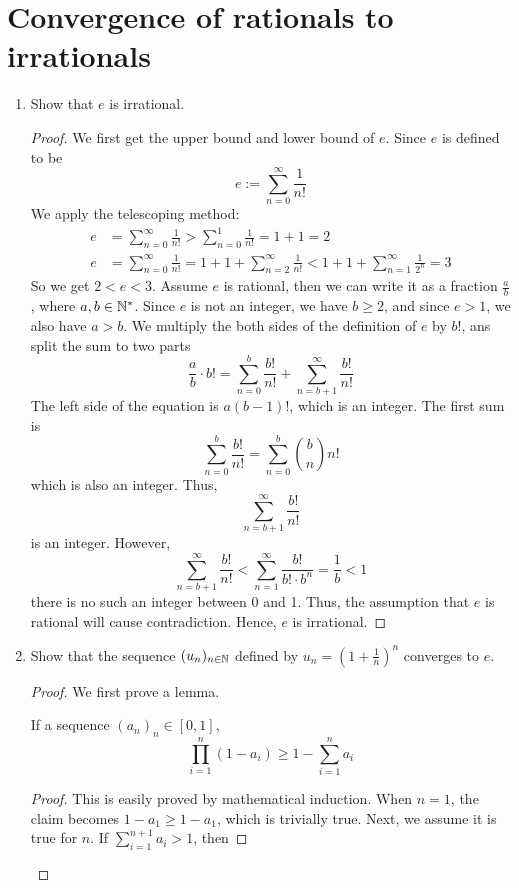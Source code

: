 \section{Convergence of rationals to irrationals}
\begin{enumerate}
	\item Show that $e$ is irrational.
    \begin{proof}
    We first get the upper bound and lower bound of $e$.
    Since $e$ is defined to be
    \[e:=\sum_{n=0}^\infty \frac{1}{n!} \]
    We apply the telescoping method:
    \begin{align*}
    	e&=\sum_{n=0}^\infty \frac{1}{n!}>\sum_{n=0}^1 \frac{1}{n!}=1+1=2\\
        e&=\sum_{n=0}^\infty \frac{1}{n!}=1+1+\sum_{n=2}^\infty \frac{1}{n!}<1+1+\sum_{n=1}^\infty \frac{1}{2^n}=3
    \end{align*}
    So we get \(2<e<3\).
    Assume $e$ is rational, then we can write it as a fraction $\frac{a}{b}$, where \(a,b\in\mathbb{N}^*\).
    Since $e$ is not an integer, we have \(b\geq2\), and since \(e>1\), we also have \(a>b\).
    We multiply the both sides of the definition of $e$ by $b!$, ans split the sum to two parts
    \[ \frac{a}{b}\cdot b!=\sum_{n=0}^b \frac{b!}{n!}+\sum_{n=b+1}^\infty \frac{b!}{n!} \]
    The left side of the equation is \(a(b-1)!\), which is an integer.
    The first sum is
    \[ \sum_{n=0}^b \frac{b!}{n!}=\sum_{n=0}^b\binom{b}{n}n! \]
    which is also an integer.
    Thus,
    \[ \sum_{n=b+1}^\infty \frac{b!}{n!} \]
    is an integer.
    However,
    \[ \sum_{n=b+1}^\infty \frac{b!}{n!}<\sum_{n=1}^\infty \frac{b!}{b!\cdot b^n}=\frac{1}{b}<1 \]
    there is no such an integer between 0 and 1.
    Thus, the assumption that $e$ is rational will cause contradiction.
    Hence, $e$ is irrational.
    \end{proof}
    \item Show that the sequence \((u_n)_{n\in\mathbb{N}}\) defined by \(u_n=\left(1+\frac{1}{n}\right)^n\) converges to $e$.
    \begin{proof}
    We first prove a lemma.
    \begin{lemma}
    If a sequence \((a_n)_n\in[0,1]\), 
    \[ \prod_{i=1}^{n}(1-a_i)\geq 1-\sum_{i=1}^n a_i \]
    \end{lemma}
    \begin{proof}
    This is easily proved by mathematical induction. 
    When \(n=1\), the claim becomes \(1-a_1\geq1-a_1\), which is trivially true.
    Next, we assume it is true for $n$.
    If \(\sum_{i=1}^{n+1}a_i>1\), then

\end{proof}
\end{proof}
\end{enumerate}
